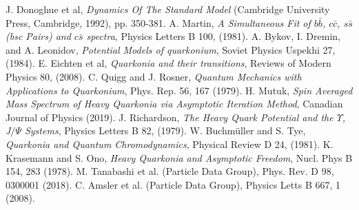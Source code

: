 \documentclass[10pt, twocolumn]{article}
\begin{document}
\begin{thebibliography}{}
    \setlength{\itemsep}{-0.7mm}
     J. Donoghue et al, \textit{Dynamics Of The Standard Model} (Cambridge University Press, Cambridge, 1992), pp. 350-381.
     A. Martin, \textit{A Simultaneous Fit of $b\bar{b}$, $c\bar{c}$, $s\bar{s}$ (bsc Pairs) and $c\bar{s}$ spectra}, Physics Letters B 100, (1981).
     A. Bykov, I. Dremin, and A. Leonidov, \textit{Potential Models of quarkonium}, Soviet Physics Uspekhi 27, (1984).
     E. Eichten et al, \textit{Quarkonia and their transitions}, Reviews of Modern Physics 80, (2008).
     C. Quigg and J. Rosner, \textit{Quantum Mechanics with Applications to Quarkonium}, Phys. Rep. 56, 167 (1979).
     H. Mutuk, \textit{Spin Averaged Mass Spectrum of Heavy Quarkonia via Asymptotic Iteration Method}, Canadian Journal of Physics (2019).
     J. Richardson, \textit{The Heavy Quark Potential and the $\Upsilon$, J$/\Psi$ Systems}, Physics Letters B 82, (1979).
     W. Buchm\"{u}ller and S. Tye, \textit{Quarkonia and Quantum Chromodynamics}, Physical Review D 24, (1981).
     K. Krasemann and S. Ono, \textit{Heavy Quarkonia and Asymptotic Freedom}, Nucl. Phys B 154, 283 (1978).
     M. Tanabashi et al. (Particle Data Group), Phys. Rev. D 98, 0300001 (2018).
     C. Amsler et al. (Particle Data Group), Physics Letts B 667, 1 (2008).
\end{thebibliography}
\end{document}
